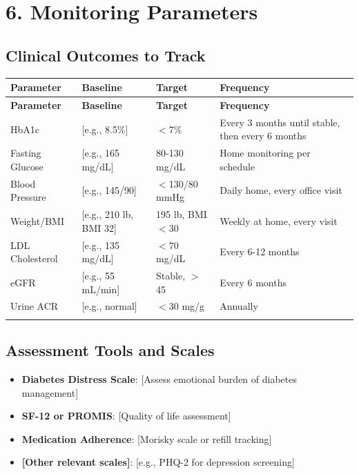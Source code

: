 \documentclass[11pt,letterpaper]{article}
\begin{document}
\section*{6. Monitoring Parameters}

\subsection*{Clinical Outcomes to Track}

\begin{longtable}{|p{4cm}|p{3cm}|p{3cm}|p{4cm}|}
\hline
\textbf{Parameter} & \textbf{Baseline} & \textbf{Target} & \textbf{Frequency} \\ \hline
\endfirsthead
\hline
\textbf{Parameter} & \textbf{Baseline} & \textbf{Target} & \textbf{Frequency} \\ \hline
\endhead

HbA1c & [e.g., 8.5\%] & $<$7\% & Every 3 months until stable, then every 6 months \\ \hline
Fasting Glucose & [e.g., 165 mg/dL] & 80-130 mg/dL & Home monitoring per schedule \\ \hline
Blood Pressure & [e.g., 145/90] & $<$130/80 mmHg & Daily home, every office visit \\ \hline
Weight/BMI & [e.g., 210 lb, BMI 32] & 195 lb, BMI $<$30 & Weekly at home, every visit \\ \hline
LDL Cholesterol & [e.g., 135 mg/dL] & $<$70 mg/dL & Every 6-12 months \\ \hline
eGFR & [e.g., 55 mL/min] & Stable, $>$45 & Every 6 months \\ \hline
Urine ACR & [e.g., normal] & $<$30 mg/g & Annually \\ \hline
[Add additional parameters] & & & \\ \hline
\end{longtable}

\subsection*{Assessment Tools and Scales}

\begin{itemize}[leftmargin=*]
    \item \textbf{Diabetes Distress Scale}: [Assess emotional burden of diabetes management]
    \item \textbf{SF-12 or PROMIS}: [Quality of life assessment]
    \item \textbf{Medication Adherence}: [Morisky scale or refill tracking]
    \item \textbf{[Other relevant scales]}: [e.g., PHQ-2 for depression screening]
\end{itemize}
\end{document}
